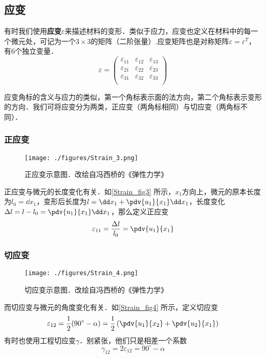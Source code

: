 \subsection{应变}
有时我们使用\textbf{应变}$\varepsilon$来描述材料的变形．类似于应力，应变也定义在材料中的每一个微元处，可记为一个$3\times3$的矩阵（二阶张量）.应变矩阵也是对称矩阵$\varepsilon=\varepsilon^T$，有$6$个独立变量．
\begin{equation}
\varepsilon = 
\begin{pmatrix}
\varepsilon_{11}&\varepsilon_{12}& \varepsilon_{13}\\
\varepsilon_{21}&\varepsilon_{22}& \varepsilon_{23}\\
\varepsilon_{31}&\varepsilon_{32}& \varepsilon_{33}\\
\end{pmatrix}
\end{equation}

应变角标的含义与应力的类似，第一个角标表示面的法方向，第二个角标表示变形的方向．我们可将应变分为两类，正应变（两角标相同）与切应变（两角标不同）．

\subsubsection{正应变}
\begin{figure}[ht]
\centering
\texttt{[image: ./figures/Strain\_3.png]}
\caption{正应变示意图．改绘自冯西桥的《弹性力学》} \label{Strain_fig3}
\end{figure}
正应变与微元的长度变化有关．如\autoref{Strain_fig3} 所示，$x_1$方向上，微元的原本长度为$l_0 = \dd x_1$，变形后长度为$ l =\dd x_1+\pdv{u_1}{x_1}\dd x_1$，长度变化$\Delta l = l-l_0 = \pdv{u_1}{x_1}\dd x_1$，那么定义正应变
\begin{equation}
\varepsilon_{11} = \frac{\Delta l}{l_0} =\pdv{u_1}{x_1}
\end{equation}

\subsubsection{切应变}
\begin{figure}[ht]
\centering
\texttt{[image: ./figures/Strain\_4.png]}
\caption{切应变示意图．改绘自冯西桥的《弹性力学》} \label{Strain_fig4}
\end{figure}
而切应变与微元的角度变化有关．如\autoref{Strain_fig4} 所示，定义切应变
\begin{equation}
\varepsilon_{12} = \frac{1}{2}(90^\circ - \alpha) = \frac{1}{2}\left(\pdv{u_1}{x_2}+\pdv{u_2}{x_1}\right)
\end{equation}
有时也使用工程切应变$\gamma$．别紧张，他们只是相差一个系数
\begin{equation}
\gamma_{12} = 2\varepsilon_{12} = 90^\circ - \alpha
\end{equation}


